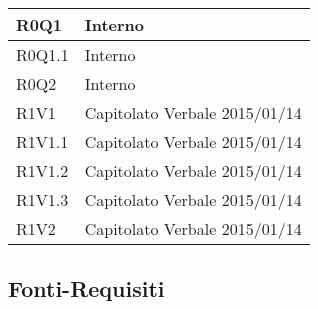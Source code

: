 \begin{center}
\begin{longtable}{| p{4cm} | p{4cm} |}
		R0Q1  &  Interno \\
		\hline
		R0Q1.1  &  Interno \\
		\hline
		R0Q2  &  Interno \\
		\hline


		R1V1 &  Capitolato \newline Verbale 2015/01/14 \\
		\hline
		R1V1.1  &  Capitolato \newline Verbale 2015/01/14 \\
		\hline
		R1V1.2  &  Capitolato \newline Verbale 2015/01/14 \\
		\hline
		R1V1.3  &  Capitolato \newline Verbale 2015/01/14 \\
		\hline
		R1V2  &  Capitolato \newline Verbale 2015/01/14 \\
		\hline

	\end{longtable}
	\egroup
	\end{center}

	
	\subsection{Fonti-Requisiti} %
	\label{sub:fonti_requisiti}

